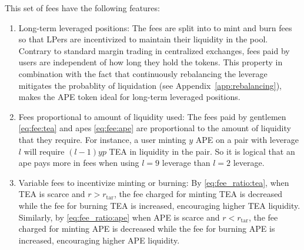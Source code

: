 \documentclass[journal,letterpaper,oneside,onecolumn,12pt]{IEEEtran}
\begin{document}
	This set of fees have the following features:
	\begin{enumerate}
		\item Long-term leveraged positions: The fees are split into to mint and burn fees so that LPers are incentivized to maintain their liquidity in the pool. Contrary to standard margin trading in centralized exchanges, fees paid by users are independent of how long they hold the tokens. This property in combination with the fact that continuously rebalancing the leverage  mitigates the probablity of liquidation (see Appendix~\ref{app:rebalancing}), makes the APE token ideal for long-term leveraged positions.
		\item Fees proportional to amount of liquidity used: The fees paid by gentlemen \eqref{eq:fee:tea} and apes \eqref{eq:fee:ape} are proportional to the amount of liquidity that they require. For instance, a user minting $y$ APE on a pair with leverage $l$ will require $(l-1)yp$ TEA in liquidity in the pair. So it is logical that an ape pays more in fees when using $l=9$ leverage than $l=2$ leverage.
		\item Variable fees to incentivize minting or burning: By \eqref{eq:fee_ratio:tea}, when TEA is scarce and $r>r_\textrm{tar}$, the fee charged for minting TEA is decreased while the fee for burning TEA is increased, encouraging higher TEA liquidity. Similarly, by \eqref{eq:fee_ratio:ape} when APE is scarce and $r<r_\textrm{tar}$, the fee charged for minting APE is decreased while the fee for burning APE is increased, encouraging higher APE liquidity.
	\end{enumerate}
\end{document}

